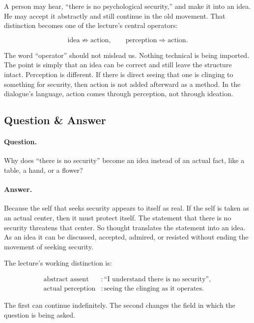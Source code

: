 A person may hear, ``there is no psychological security,'' and make it into an idea. He may accept it abstractly and still continue in the old movement. That distinction becomes one of the lecture's central operators:

\begin{equation}
\text{idea} \not\Rightarrow \text{action},
\qquad
\text{perception} \Rightarrow \text{action}.
\end{equation}

The word ``operator'' should not mislead us. Nothing technical is being imported. The point is simply that an idea can be correct and still leave the structure intact. Perception is different. If there is direct seeing that one is clinging to something for security, then action is not added afterward as a method. In the dialogue's language, action comes through perception, not through ideation.

\subsection{Question \& Answer}

\paragraph{Question.}
Why does ``there is no security'' become an idea instead of an actual fact, like a table, a hand, or a flower?

\paragraph{Answer.}
Because the self that seeks security appears to itself as real. If the self is taken as an actual center, then it must protect itself. The statement that there is no security threatens that center. So thought translates the statement into an idea. As an idea it can be discussed, accepted, admired, or resisted without ending the movement of seeking security.

The lecture's working distinction is:

\begin{align}
\text{abstract assent} &: \text{``I understand there is no security''}, \\
\text{actual perception} &: \text{seeing the clinging as it operates}.
\end{align}

The first can continue indefinitely. The second changes the field in which the question is being asked.

